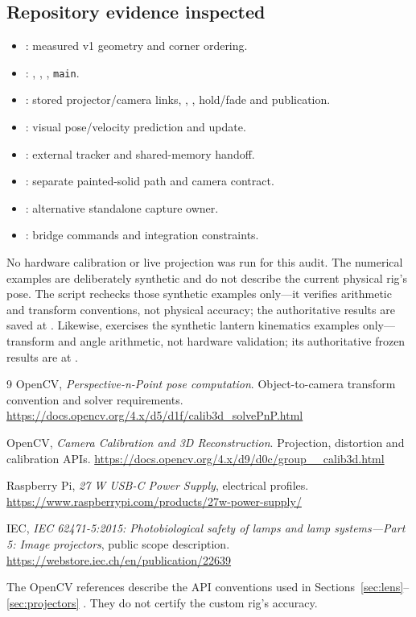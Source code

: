 \documentclass[11pt,a4paper]{article}
\begin{document}
\subsection*{Repository evidence inspected}
\begin{itemize}
  \item {}: measured v1 geometry and corner ordering.
  \item {}: ,
    , , \texttt{main}.
  \item {}: stored projector/camera links,
    , , hold/fade and publication.
  \item {}: visual pose/velocity prediction and update.
  \item {}: external tracker and shared-memory handoff.
  \item {}: separate painted-solid path and camera contract.
  \item {}: alternative standalone capture owner.
  \item {}: bridge commands and integration constraints.
\end{itemize}
No hardware calibration or live projection was run for this audit.
The numerical examples are deliberately synthetic and do not describe the
current physical rig's pose. The script
 rechecks those synthetic
examples only---it verifies arithmetic and transform conventions, not
physical accuracy; the authoritative results are saved at
.
Likewise, 
exercises the synthetic lantern kinematics examples only---transform and
angle arithmetic, not hardware validation; its authoritative frozen
results are at .

\begin{thebibliography}{9}
OpenCV, \emph{Perspective-n-Point pose computation}.
Object-to-camera transform convention and solver requirements.
\url{https://docs.opencv.org/4.x/d5/d1f/calib3d_solvePnP.html}

OpenCV, \emph{Camera Calibration and 3D Reconstruction}.
Projection, distortion and calibration APIs.
\url{https://docs.opencv.org/4.x/d9/d0c/group__calib3d.html}

Raspberry Pi, \emph{27 W USB-C Power Supply}, electrical profiles.
\url{https://www.raspberrypi.com/products/27w-power-supply/}

IEC, \emph{IEC 62471-5:2015: Photobiological safety of lamps and lamp
systems---Part 5: Image projectors}, public scope description.
\url{https://webstore.iec.ch/en/publication/22639}
\end{thebibliography}
The OpenCV references describe the API conventions used in
Sections~\ref{sec:lens}--\ref{sec:projectors}
\cite{opencv-pnp,opencv-calib}. They do not certify the custom rig's accuracy.
\end{document}
